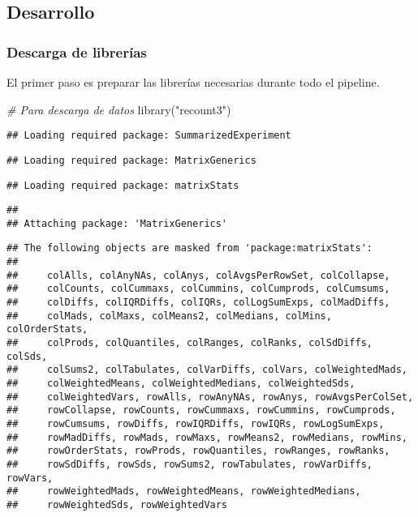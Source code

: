 \documentclass[
]{article}
\newenvironment{Shaded}{\begin{snugshade}}{\end{snugshade}}
\newcommand{\CommentTok}[1]{\textcolor[rgb]{0.56,0.35,0.01}{\textit{#1}}}
\newcommand{\FunctionTok}[1]{\textcolor[rgb]{0.00,0.00,0.00}{#1}}
\newcommand{\NormalTok}[1]{#1}
\newcommand{\StringTok}[1]{\textcolor[rgb]{0.31,0.60,0.02}{#1}}
\begin{document}
\hypertarget{desarrollo}{%
\subsection{Desarrollo}\label{desarrollo}}

\hypertarget{descarga-de-libreruxedas}{%
\subsubsection{Descarga de librerías}\label{descarga-de-libreruxedas}}

El primer paso es preparar las librerías necesarias durante todo el
pipeline.

\begin{Shaded}
\begin{Highlighting}[]
\CommentTok{\# Para descarga de datos}
\FunctionTok{library}\NormalTok{(}\StringTok{"recount3"}\NormalTok{)}
\end{Highlighting}
\end{Shaded}

\begin{verbatim}
## Loading required package: SummarizedExperiment
\end{verbatim}

\begin{verbatim}
## Loading required package: MatrixGenerics
\end{verbatim}

\begin{verbatim}
## Loading required package: matrixStats
\end{verbatim}

\begin{verbatim}
## 
## Attaching package: 'MatrixGenerics'
\end{verbatim}

\begin{verbatim}
## The following objects are masked from 'package:matrixStats':
## 
##     colAlls, colAnyNAs, colAnys, colAvgsPerRowSet, colCollapse,
##     colCounts, colCummaxs, colCummins, colCumprods, colCumsums,
##     colDiffs, colIQRDiffs, colIQRs, colLogSumExps, colMadDiffs,
##     colMads, colMaxs, colMeans2, colMedians, colMins, colOrderStats,
##     colProds, colQuantiles, colRanges, colRanks, colSdDiffs, colSds,
##     colSums2, colTabulates, colVarDiffs, colVars, colWeightedMads,
##     colWeightedMeans, colWeightedMedians, colWeightedSds,
##     colWeightedVars, rowAlls, rowAnyNAs, rowAnys, rowAvgsPerColSet,
##     rowCollapse, rowCounts, rowCummaxs, rowCummins, rowCumprods,
##     rowCumsums, rowDiffs, rowIQRDiffs, rowIQRs, rowLogSumExps,
##     rowMadDiffs, rowMads, rowMaxs, rowMeans2, rowMedians, rowMins,
##     rowOrderStats, rowProds, rowQuantiles, rowRanges, rowRanks,
##     rowSdDiffs, rowSds, rowSums2, rowTabulates, rowVarDiffs, rowVars,
##     rowWeightedMads, rowWeightedMeans, rowWeightedMedians,
##     rowWeightedSds, rowWeightedVars
\end{verbatim}
\end{document}
